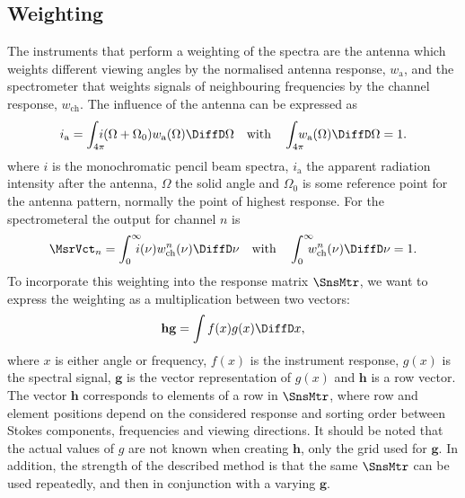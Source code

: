 \subsection{Weighting}
The instruments that perform a weighting of the spectra are the
antenna which weights different viewing angles by the normalised
antenna response, $w_\mathrm{a}$, and the spectrometer that weights
signals of neighbouring frequencies by the channel response,
$w_\mathrm{ch}$. The influence of the antenna can be expressed as
\begin{equation}
  \label{eq:sensor:weight:antenna}
  i_\mathrm{a} = \int_{4\pi}\!\!\!\!i(\Omega+\Omega_0) 
                 w_\mathrm{a}(\Omega) \DiffD\Omega
                 \quad \textrm{with} \quad 
  \int_{4\pi}\!\!\!\!w_\mathrm{a}(\Omega)\DiffD\Omega = 1.
\end{equation} 
where $i$ is the monochromatic pencil beam spectra, $i_\mathrm{a}$ the
apparent radiation intensity after the antenna, $\Omega$ the solid
angle and $\Omega_0$ is some reference point for the antenna pattern,
normally the point of highest response. For the spectrometeral the
output for channel $n$ is
\begin{equation}
  \label{eq:sensor:weight:spectrometer} 
  \MsrVct_n = \int_{0}^{\infty}\!\!\!\!i(\nu) w_\mathrm{ch}^n(\nu) \DiffD\nu 
         \quad \textrm{with} \quad 
  \int_{0}^{\infty}\!\!\!\!w_\mathrm{ch}^n(\nu)\DiffD\nu = 1.
\end{equation} 
To incorporate this weighting
into the response matrix $\SnsMtr$, we want to express the
weighting as a multiplication between two vectors:
\begin{equation}
  \label{eq:sensor:weight:integr}
  \mathbf{h}\mathbf{g} = \int f(x)g(x)\DiffD x,
\end{equation} 
where $x$ is either angle or frequency, $f(x)$ is the instrument
response, $g(x)$ is the spectral signal, $\mathbf{g}$ is the vector
representation of $g(x)$ and $\mathbf{h}$ is a row vector. The
vector $\mathbf{h}$ corresponds to elements of a row in
$\SnsMtr$, where row and element positions depend on the considered
response and sorting order between Stokes components, frequencies
and viewing directions. It should be noted that the actual values
of $g$ are not known when creating $\mathbf{h}$, only the grid used
for $\mathbf{g}$. In addition, the strength of the described method
is that the same $\SnsMtr$ can be used repeatedly, and then in
conjunction with a varying $\mathbf{g}$.
  
